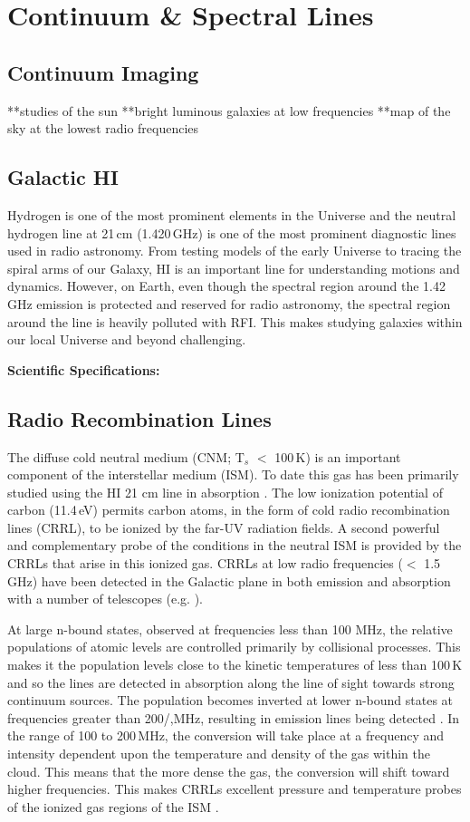 \section{Continuum \& Spectral Lines}

\subsection{Continuum Imaging}
**studies of the sun
**bright luminous galaxies at low frequencies
**map of the sky at the lowest radio frequencies

\subsection{Galactic HI}
Hydrogen is one of the most prominent elements in the Universe and the neutral hydrogen line at 21\,cm (1.420\,GHz) is one of the most prominent diagnostic lines used in radio astronomy. From testing models of the early Universe to tracing the spiral arms of our Galaxy, H{\sc I} is an important line for understanding motions and dynamics. However, on Earth, even though the spectral region around the 1.42\,GHz emission is protected and reserved for radio astronomy, the spectral region around the line is heavily polluted with RFI. This makes studying galaxies within our local Universe and beyond challenging. 

\textbf{Scientific Specifications:}

\subsection{Radio Recombination Lines}
The diffuse cold neutral medium (CNM; T$_{s}$ $<$ 100\,K) is an important component of the interstellar medium (ISM). To date this gas has been primarily studied using the HI 21 cm line in absorption \citep{Dickey_1990}. The low ionization potential of carbon (11.4\,eV) permits carbon atoms, in the form of cold radio recombination lines (CRRL), to be ionized by the far-UV radiation fields. A second powerful and complementary probe of the conditions in the neutral ISM is provided by the CRRLs that arise in this ionized gas. CRRLs at low radio frequencies ($<$ 1.5 GHz) have been detected in the Galactic plane in both emission and absorption with a number of telescopes (e.g. \citealt{Kantharia_2001,Salas_2019}). 

At large n-bound states, observed at frequencies less than 100 MHz, the relative populations of atomic levels are controlled primarily by collisional processes. This makes it the population levels close to the kinetic temperatures of less than 100\,K and so the lines are detected in absorption along the line of sight towards strong continuum sources. The population becomes inverted at lower n-bound states at frequencies greater than 200/,MHz, resulting in emission lines being detected \citep{Tremblay_2018}. In the range of 100 to 200\,MHz, the conversion will take place at a frequency and intensity dependent upon the temperature and density of the gas within the cloud. This means that the more dense the gas, the conversion will shift toward higher frequencies. This makes CRRLs excellent pressure and temperature probes of the ionized gas regions of the ISM \citep{Salas_2019}.


